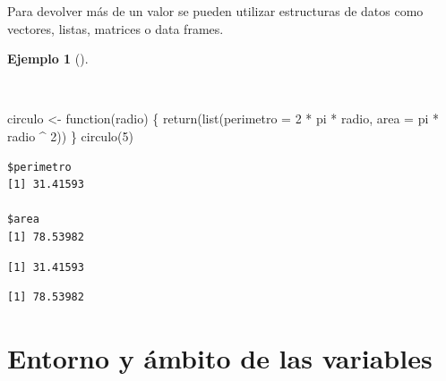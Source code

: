 \documentclass[
  a4paper,
]{scrreport}
\newenvironment{Shaded}{\begin{snugshade}}{\end{snugshade}}
\newcommand{\AttributeTok}[1]{\textcolor[rgb]{0.40,0.45,0.13}{#1}}
\newcommand{\ControlFlowTok}[1]{\textcolor[rgb]{0.00,0.23,0.31}{#1}}
\newcommand{\DecValTok}[1]{\textcolor[rgb]{0.68,0.00,0.00}{#1}}
\newcommand{\FunctionTok}[1]{\textcolor[rgb]{0.28,0.35,0.67}{#1}}
\newcommand{\NormalTok}[1]{\textcolor[rgb]{0.00,0.23,0.31}{#1}}
\newcommand{\OtherTok}[1]{\textcolor[rgb]{0.00,0.23,0.31}{#1}}
\newcommand{\SpecialCharTok}[1]{\textcolor[rgb]{0.37,0.37,0.37}{#1}}
\theoremstyle{definition}
\theoremstyle{definition}
\newtheorem{example}{Ejemplo}[chapter]
\theoremstyle{remark}
\begin{document}
Para devolver más de un valor se pueden utilizar estructuras de datos
como vectores, listas, matrices o data frames.

\begin{example}[]\protect\hypertarget{exm-retorno-funcion-lista}{}\label{exm-retorno-funcion-lista}

~

\begin{Shaded}
\begin{Highlighting}[]
\NormalTok{circulo }\OtherTok{\textless{}{-}} \ControlFlowTok{function}\NormalTok{(radio) \{}
  \FunctionTok{return}\NormalTok{(}\FunctionTok{list}\NormalTok{(}\AttributeTok{perimetro =} \DecValTok{2} \SpecialCharTok{*}\NormalTok{ pi }\SpecialCharTok{*}\NormalTok{ radio, }\AttributeTok{area =}\NormalTok{ pi }\SpecialCharTok{*}\NormalTok{ radio }\SpecialCharTok{\^{}} \DecValTok{2}\NormalTok{))}
\NormalTok{\}}
\FunctionTok{circulo}\NormalTok{(}\DecValTok{5}\NormalTok{)}
\end{Highlighting}
\end{Shaded}

\begin{verbatim}
$perimetro
[1] 31.41593

$area
[1] 78.53982
\end{verbatim}

\begin{Shaded}
\end{Shaded}

\begin{verbatim}
[1] 31.41593
\end{verbatim}

\begin{Shaded}
\end{Shaded}

\begin{verbatim}
[1] 78.53982
\end{verbatim}

\end{example}

\hypertarget{entorno-y-uxe1mbito-de-las-variables}{%
\section{Entorno y ámbito de las
variables}\label{entorno-y-uxe1mbito-de-las-variables}}
\end{document}
